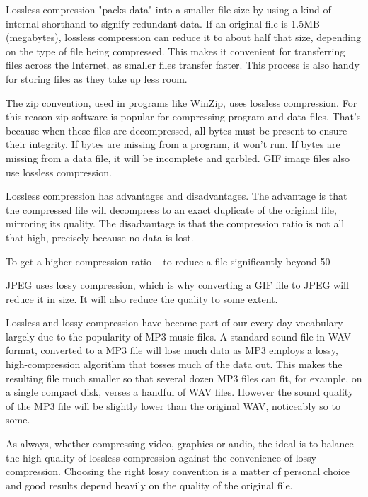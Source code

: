 
Lossless compression "packs data" into a smaller file size by using a kind of internal shorthand to signify redundant data. If an original file is 1.5MB (megabytes), lossless compression can reduce it to about half that size, depending on the type of file being compressed. This makes it convenient for transferring files across the Internet, as smaller files transfer faster. This process is also handy for storing files as they take up less room.

The zip convention, used in programs like WinZip, uses lossless compression. For this reason zip software is popular for compressing program and data files. That's because when these files are decompressed, all bytes must be present to ensure their integrity. If bytes are missing from a program, it won't run. If bytes are missing from a data file, it will be incomplete and garbled. GIF image files also use lossless compression.


Lossless compression has advantages and disadvantages. The advantage is that the compressed file will decompress to an exact duplicate of the original file, mirroring its quality. The disadvantage is that the compression ratio is not all that high, precisely because no data is lost.

To get a higher compression ratio -- to reduce a file significantly beyond 50%

JPEG uses lossy compression, which is why converting a GIF file to JPEG will reduce it in size. It will also reduce the quality to some extent.

Lossless and lossy compression have become part of our every day vocabulary largely due to the popularity of MP3 music files. A standard sound file in WAV format, converted to a MP3 file will lose much data as MP3 employs a lossy, high-compression algorithm that tosses much of the data out. This makes the resulting file much smaller so that several dozen MP3 files can fit, for example, on a single compact disk, verses a handful of WAV files. However the sound quality of the MP3 file will be slightly lower than the original WAV, noticeably so to some.

As always, whether compressing video, graphics or audio, the ideal is to balance the high quality of lossless compression against the convenience of lossy compression. Choosing the right lossy convention is a matter of personal choice and good results depend heavily on the quality of the original file.


